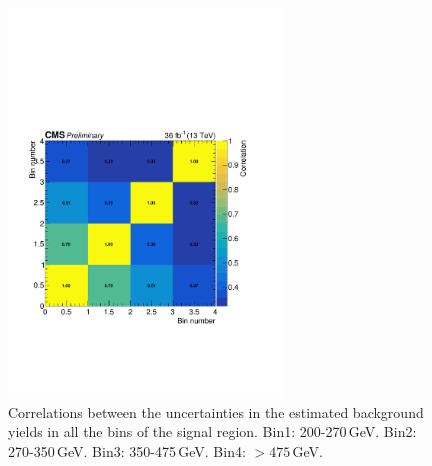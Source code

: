 \begin{figure}
\centering
\includegraphics[width=0.65\textwidth]{figures/pullsImpact/corr.pdf}
\caption{Correlations between the uncertainties in the estimated background yields in all the \ETmiss bins of the signal region. Bin1: 200-270\,GeV. Bin2: 270-350\,GeV. Bin3: 350-475\,GeV. Bin4: $>475$\,GeV.}
\label{covariance_matrix}
\end{figure}

\clearpage

